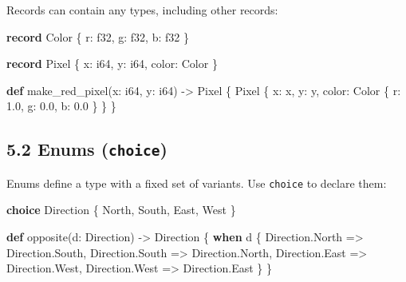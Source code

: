 \documentclass[
  english,
]{book}
\newenvironment{Shaded}{\begin{snugshade}}{\end{snugshade}}
\newcommand{\ControlFlowTok}[1]{\textcolor[rgb]{0.77,0.53,0.75}{\textbf{#1}}}
\newcommand{\DataTypeTok}[1]{\textcolor[rgb]{0.31,0.79,0.69}{#1}}
\newcommand{\FloatTok}[1]{\textcolor[rgb]{0.71,0.81,0.66}{#1}}
\newcommand{\KeywordTok}[1]{\textcolor[rgb]{0.34,0.61,0.84}{\textbf{#1}}}
\newcommand{\NormalTok}[1]{\textcolor[rgb]{0.83,0.83,0.83}{#1}}
\newcommand{\OperatorTok}[1]{\textcolor[rgb]{0.83,0.83,0.83}{#1}}
\begin{document}
Records can contain any types, including other records:

\begin{Shaded}
\begin{Highlighting}[]
\KeywordTok{record}\NormalTok{ Color \{}
\NormalTok{    r: }\DataTypeTok{f32}\NormalTok{,}
\NormalTok{    g: }\DataTypeTok{f32}\NormalTok{,}
\NormalTok{    b: }\DataTypeTok{f32}
\NormalTok{\}}

\KeywordTok{record}\NormalTok{ Pixel \{}
\NormalTok{    x: }\DataTypeTok{i64}\NormalTok{,}
\NormalTok{    y: }\DataTypeTok{i64}\NormalTok{,}
\NormalTok{    color: Color}
\NormalTok{\}}

\KeywordTok{def}\NormalTok{ make\_red\_pixel(x: }\DataTypeTok{i64}\NormalTok{, y: }\DataTypeTok{i64}\NormalTok{) }\OperatorTok{{-}\textgreater{}}\NormalTok{ Pixel \{}
\NormalTok{    Pixel \{}
\NormalTok{        x: x,}
\NormalTok{        y: y,}
\NormalTok{        color: Color \{ r: }\FloatTok{1.0}\NormalTok{, g: }\FloatTok{0.0}\NormalTok{, b: }\FloatTok{0.0}\NormalTok{ \}}
\NormalTok{    \}}
\NormalTok{\}}
\end{Highlighting}
\end{Shaded}

\subsection{\texorpdfstring{5.2 Enums
(\texttt{choice})}{5.2 Enums (choice)}}\label{enums-choice}

Enums define a type with a fixed set of variants. Use \texttt{choice} to
declare them:

\begin{Shaded}
\begin{Highlighting}[]
\KeywordTok{choice}\NormalTok{ Direction \{}
\NormalTok{    North,}
\NormalTok{    South,}
\NormalTok{    East,}
\NormalTok{    West}
\NormalTok{\}}

\KeywordTok{def}\NormalTok{ opposite(d: Direction) }\OperatorTok{{-}\textgreater{}}\NormalTok{ Direction \{}
    \ControlFlowTok{when}\NormalTok{ d \{}
\NormalTok{        Direction}\OperatorTok{.}\NormalTok{North }\OperatorTok{=\textgreater{}}\NormalTok{ Direction}\OperatorTok{.}\NormalTok{South,}
\NormalTok{        Direction}\OperatorTok{.}\NormalTok{South }\OperatorTok{=\textgreater{}}\NormalTok{ Direction}\OperatorTok{.}\NormalTok{North,}
\NormalTok{        Direction}\OperatorTok{.}\NormalTok{East  }\OperatorTok{=\textgreater{}}\NormalTok{ Direction}\OperatorTok{.}\NormalTok{West,}
\NormalTok{        Direction}\OperatorTok{.}\NormalTok{West  }\OperatorTok{=\textgreater{}}\NormalTok{ Direction}\OperatorTok{.}\NormalTok{East}
\NormalTok{    \}}
\NormalTok{\}}
\end{Highlighting}
\end{Shaded}
\end{document}
